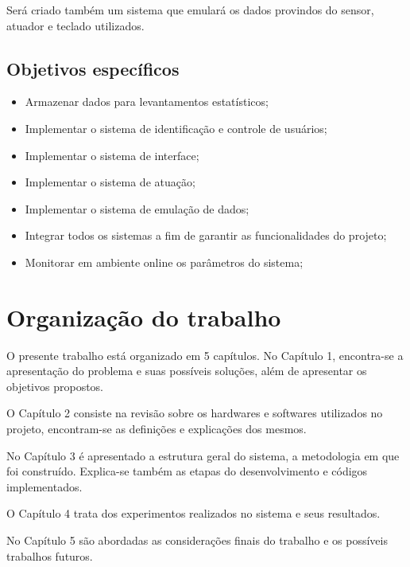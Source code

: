 Será criado também um sistema que emulará os dados provindos do sensor, atuador e teclado utilizados.

\subsection{Objetivos específicos}

\begin{itemize}
	\item Armazenar dados para levantamentos estatísticos;
	\item Implementar o sistema de identificação e controle de usuários;
	\item Implementar o sistema de interface;
	\item Implementar o sistema de atuação;
	\item Implementar o sistema de emulação de dados;
	\item Integrar todos os sistemas a fim de garantir as funcionalidades do projeto;
	\item Monitorar em ambiente online os parâmetros do sistema;
\end{itemize}

%

%
\section{Organização do trabalho}

O presente trabalho está organizado em 5 capítulos. No Capítulo 1, encontra-se a apresentação do problema e suas possíveis soluções, além de apresentar os objetivos propostos.

O Capítulo 2 consiste na revisão sobre os hardwares e softwares utilizados no projeto, encontram-se as definições e explicações dos mesmos.

No Capítulo 3 é apresentado a estrutura geral do sistema, a metodologia em que foi construído. Explica-se também as etapas do desenvolvimento e códigos implementados.

O Capítulo 4 trata dos experimentos realizados no sistema e seus resultados.

No Capítulo 5 são abordadas as considerações finais do trabalho e os possíveis trabalhos futuros.